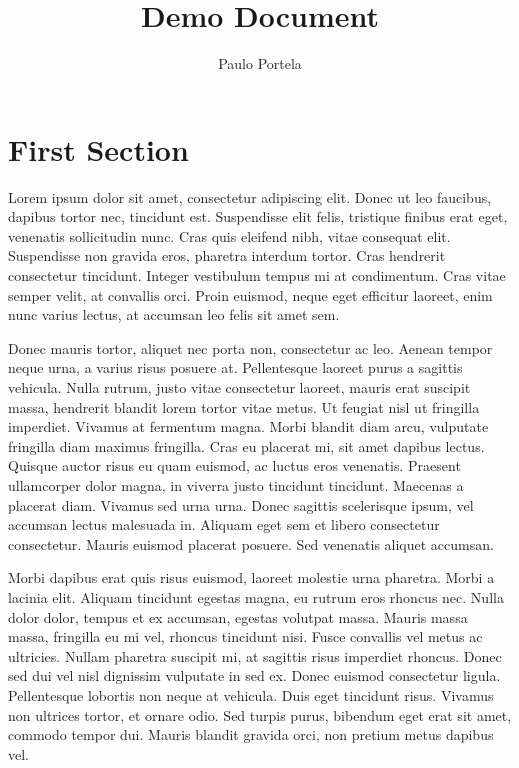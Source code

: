 \documentclass{article}
\begin{document}
	\title{Demo Document}  %
	\author{Paulo Portela}  %
	\maketitle  %
	\thispagestyle{empty}  %
	\newpage
	
	\setcounter{page}{1}  %
	
	\tableofcontents
	\newpage
	
	\setcounter{page}{1}  %
	
	\section{First Section}
	
	Lorem ipsum dolor sit amet, consectetur adipiscing elit. Donec ut leo faucibus, dapibus tortor nec, tincidunt est. Suspendisse elit felis, tristique finibus erat eget, venenatis sollicitudin nunc. Cras quis eleifend nibh, vitae consequat elit. Suspendisse non gravida eros, pharetra interdum tortor. Cras hendrerit consectetur tincidunt. Integer vestibulum tempus mi at condimentum. Cras vitae semper velit, at convallis orci. Proin euismod, neque eget efficitur laoreet, enim nunc varius lectus, at accumsan leo felis sit amet sem.
	
	Donec mauris tortor, aliquet nec porta non, consectetur ac leo. Aenean tempor neque urna, a varius risus posuere at. Pellentesque laoreet purus a sagittis vehicula. Nulla rutrum, justo vitae consectetur laoreet, mauris erat suscipit massa, hendrerit blandit lorem tortor vitae metus. Ut feugiat nisl ut fringilla imperdiet. Vivamus at fermentum magna. Morbi blandit diam arcu, vulputate fringilla diam maximus fringilla. Cras eu placerat mi, sit amet dapibus lectus. Quisque auctor risus eu quam euismod, ac luctus eros venenatis. Praesent ullamcorper dolor magna, in viverra justo tincidunt tincidunt. Maecenas a placerat diam. Vivamus sed urna urna. Donec sagittis scelerisque ipsum, vel accumsan lectus malesuada in. Aliquam eget sem et libero consectetur consectetur. Mauris euismod placerat posuere. Sed venenatis aliquet accumsan.
	
	Morbi dapibus erat quis risus euismod, laoreet molestie urna pharetra. Morbi a lacinia elit. Aliquam tincidunt egestas magna, eu rutrum eros rhoncus nec. Nulla dolor dolor, tempus et ex accumsan, egestas volutpat massa. Mauris massa massa, fringilla eu mi vel, rhoncus tincidunt nisi. Fusce convallis vel metus ac ultricies. Nullam pharetra suscipit mi, at sagittis risus imperdiet rhoncus. Donec sed dui vel nisl dignissim vulputate in sed ex. Donec euismod consectetur ligula. Pellentesque lobortis non neque at vehicula. Duis eget tincidunt risus. Vivamus non ultrices tortor, et ornare odio. Sed turpis purus, bibendum eget erat sit amet, commodo tempor dui. Mauris blandit gravida orci, non pretium metus dapibus vel.
	
\end{document}
